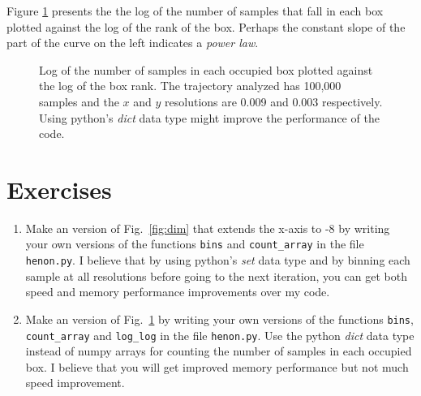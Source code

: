 \documentclass[twocolumn]{article}
\begin{document}
Figure \ref{fig:count} presents the the log of the number of samples
that fall in each box plotted against the log of the rank of the box.
Perhaps the constant slope of the part of the curve on the left
indicates a \emph{power law}.
\begin{figure}
  \centering
  \caption{Log of the number of samples in each occupied box plotted
    against the log of the box rank.  The trajectory analyzed has
    100,000 samples and the $x$ and $y$ resolutions are 0.009 and
    0.003 respectively.  Using python's \emph{dict} data type might
    improve the performance of the code.}
  \label{fig:count}
\end{figure}

\section{Exercises}
\label{sec:exercises}
\begin{enumerate}
\item \label{it:set} Make an version of Fig.~\ref{fig:dim} that
  extends the x-axis to -8 by writing your own versions of the
  functions \texttt{bins} and \texttt{count\_array} in the file
  \texttt{henon.py}.  I believe that by using python's \emph{set} data
  type and by binning each sample at all resolutions before going to
  the next iteration, you can get both speed and memory performance
  improvements over my code.
\item Make an version of Fig.~\ref{fig:count} by writing your own
  versions of the functions \texttt{bins}, \texttt{count\_array} and
  \texttt{log\_log} in the file \texttt{henon.py}.  Use the python
  \emph{dict} data type instead of numpy arrays for counting the
  number of samples in each occupied box.  I believe that you will get
  improved memory performance but not much speed improvement.
\end{enumerate}

 
\end{document}
